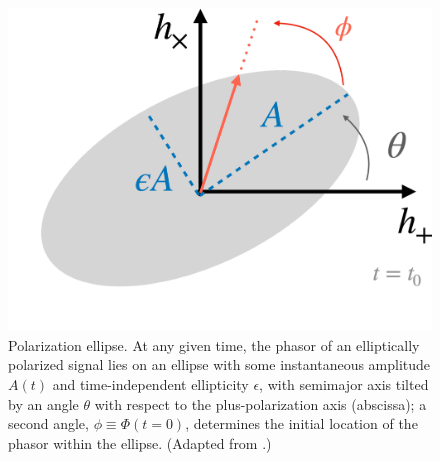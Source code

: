 \documentclass[aps,prd,twocolumn,superscriptaddress,preprintnumbers,floatfix,nofootinbib]{revtex4-2}
\begin{document}
\begin{figure}
\includegraphics[width=0.6\columnwidth]{ellipse}
\caption{Polarization ellipse. At any given time, the phasor of an elliptically polarized signal lies on an ellipse with some instantaneous amplitude $A(t)$ and time-independent ellipticity $\epsilon$, with semimajor axis tilted by an angle $\theta$ with respect to the plus-polarization axis (abscissa); a second angle, $\phi \equiv \Phi(t=0)$, determines the initial location of the phasor within the ellipse. (Adapted from \cite{Isi:2021iql}.)}
\label{fig:ellipse}
\end{figure}
\end{document}
